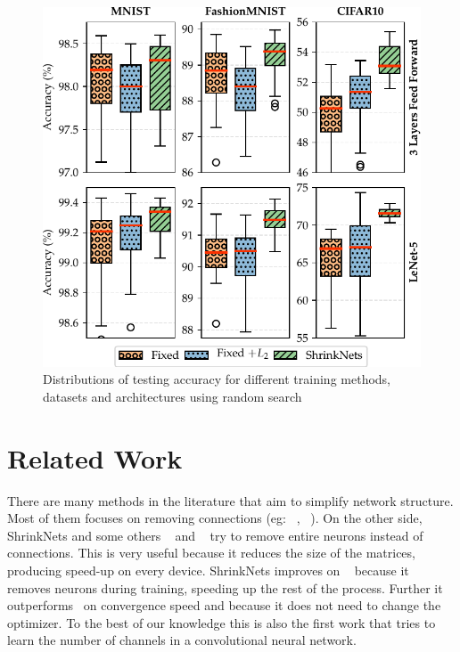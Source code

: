 \documentclass[sigconf]{acmart}
\begin{document}
\begin{figure}
\vspace{-.2in}
\begin{center}
  \includegraphics[width=\columnwidth]{hyper_opt}
  \vspace{-.2in}
\caption{Distributions of testing accuracy for different training methods, datasets and architectures using random search\label{hyper_opt_res}}
\vspace{-.2in}
\end{center}
\end{figure}

\section{Related Work}

There are many methods in the literature that aim to simplify network
structure. Most of them focuses on removing connections (eg: ~\cite{Cun},
~\cite{Han2015}). On the other side, ShrinkNets and some others
~\cite{Scardapane2017} and ~\cite{Philipp} try to remove entire neurons instead
of connections. This is very useful because it reduces the size of the matrices,
producing speed-up on every device. ShrinkNets improves on
~\cite{Scardapane2017} because it removes neurons during training, speeding up
the rest of the process. Further it outperforms~\cite{Philipp} on convergence
speed and because it does not need to change the optimizer. To the best of our
knowledge this is also the first work that tries to learn the number of channels
in a convolutional neural network.
\end{document}
